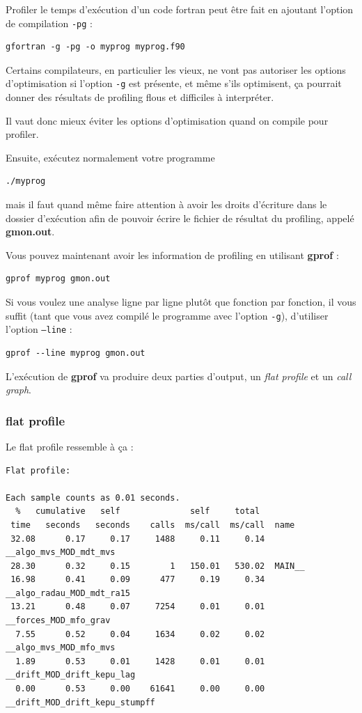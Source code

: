 \documentclass[a4paper,twoside]{article}
\begin{document}
Profiler le temps d'exécution d'un code fortran peut être fait en ajoutant l'option de compilation \texttt{-pg} : 
\begin{verbatim}
gfortran -g -pg -o myprog myprog.f90
\end{verbatim}

\begin{remarque}
Certains compilateurs, en particulier les vieux, ne vont pas autoriser les options d'optimisation si l'option \texttt{-g} est présente, et même s'ils optimisent, ça pourrait donner des résultats de profiling flous et difficiles à interpréter. 

Il vaut donc mieux éviter les options d'optimisation quand on compile pour profiler. 
\end{remarque}

Ensuite, exécutez normalement votre programme
\begin{verbatim}
./myprog
\end{verbatim}
mais il faut quand même faire attention à avoir les droits d'écriture dans le dossier d'exécution afin de pouvoir écrire le fichier de résultat du profiling, appelé \textbf{gmon.out}. 

\bigskip

Vous pouvez maintenant avoir les information de profiling en utilisant \textbf{gprof} :
\begin{verbatim}
gprof myprog gmon.out
\end{verbatim}

\begin{remarque}
Si vous voulez une analyse ligne par ligne plutôt que fonction par fonction, il vous suffit (tant que vous avez compilé le programme avec l'option \texttt{-g}), d'utiliser l'option \texttt{--line} :
\begin{verbatim}
gprof --line myprog gmon.out
\end{verbatim}
\end{remarque}

L'exécution de \textbf{gprof} va produire deux parties d'output, un \textit{flat profile} et un \textit{call graph}.
\subsubsection{flat profile}
Le flat profile ressemble à ça : 
\begin{verbatim}
Flat profile:

Each sample counts as 0.01 seconds.
  %   cumulative   self              self     total           
 time   seconds   seconds    calls  ms/call  ms/call  name    
 32.08      0.17     0.17     1488     0.11     0.14  __algo_mvs_MOD_mdt_mvs
 28.30      0.32     0.15        1   150.01   530.02  MAIN__
 16.98      0.41     0.09      477     0.19     0.34  __algo_radau_MOD_mdt_ra15
 13.21      0.48     0.07     7254     0.01     0.01  __forces_MOD_mfo_grav
  7.55      0.52     0.04     1634     0.02     0.02  __algo_mvs_MOD_mfo_mvs
  1.89      0.53     0.01     1428     0.01     0.01  __drift_MOD_drift_kepu_lag
  0.00      0.53     0.00    61641     0.00     0.00  __drift_MOD_drift_kepu_stumpff
\end{verbatim}
\end{document}
